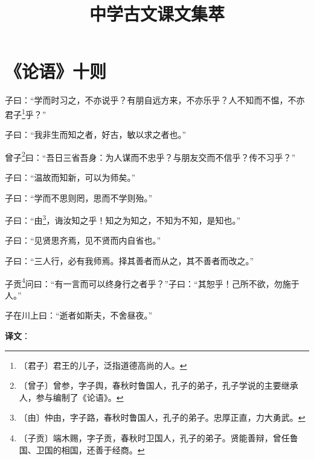 \documentclass[12pt,UTF-8,openany]{ctexbook}
\title{\zihao{0} \bfseries 中学古文课文集萃}
\author{}
\date{}
\begin{document}
\maketitle
\tableofcontents
\newpage

\chapter{《论语》十则}

\begin{normalsize}
    
    子曰：“学而时习之，不亦说乎？有朋自远方来，不亦乐乎？人不知而不愠，不亦君子\footnote{〔君子〕君王的儿子，泛指道德高尚的人。}乎？”
    
    子曰：“我非生而知之者，好古，敏以求之者也。”
    
    曾子\footnote{〔曾子〕曾参，字子舆，春秋时鲁国人，孔子的弟子，孔子学说的主要继承人，参与编制了《论语》。}曰：“吾日三省吾身：为人谋而不忠乎？与朋友交而不信乎？传不习乎？”
    
    子曰：“温故而知新，可以为师矣。”
    
    子曰：“学而不思则罔，思而不学则殆。”
    
    子曰：“由\footnote{〔由〕仲由，字子路，春秋时鲁国人，孔子的弟子。忠厚正直，力大勇武。}，诲汝知之乎！知之为知之，不知为不知，是知也。”
    
    子曰：“见贤思齐焉，见不贤而内自省也。”
    
    子曰：“三人行，必有我师焉。择其善者而从之，其不善者而改之。”
    
    子贡\footnote{〔子贡〕端木赐，字子贡，春秋时卫国人，孔子的弟子。贤能善辩，曾任鲁国、卫国的相国，还善于经商。}问曰：“有一言而可以终身行之者乎？”子曰：“其恕乎！己所不欲，勿施于人。”
    
    子在川上曰：“逝者如斯夫，不舍昼夜。”
\end{normalsize}


\newpage

\textbf{译文}：

\vspace{1em}
\end{document}

